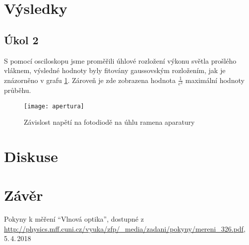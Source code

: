 \documentclass{protokol}
\begin{document}
  \section*{Výsledky}

    \subsection*{Úkol 2}

      S pomocí osciloskopu jsme proměřili úhlové rozložení výkonu světla prošlého vláknem, výsledné hodnoty byly fitovány gaussovským rozložením, jak je znázorněno v grafu \ref{fig:apertura}. Zároveň je zde zobrazena hodnota $\frac{1}{e^2}$ maximální hodnoty průběhu.

      \begin{figure}[H]
        \centering
        \texttt{[image: apertura]}
        \caption{Závislost napětí na fotodiodě na úhlu ramena aparatury}
        \label{fig:apertura}
      \end{figure}

  \section*{Diskuse}

  \section*{Závěr}
      
  \begin{thebibliography}{}
 
    Pokyny k měření ``Vlnová optika'', dostupné z\\ \url{http://physics.mff.cuni.cz/vyuka/zfp/_media/zadani/pokyny/mereni_326.pdf}, 5.\,4.\,2018
   
  \end{thebibliography}
\end{document}
